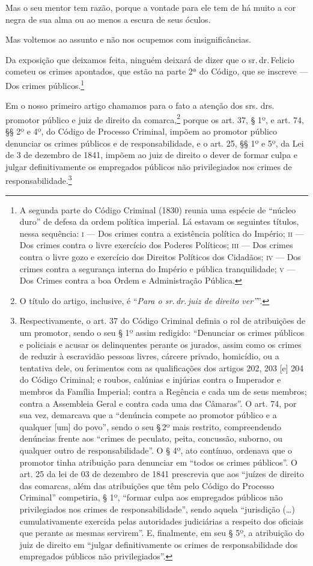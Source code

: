 Mas o seu mentor tem razão, porque a vontade para ele tem de há muito a
cor negra de sua alma ou ao menos a escura de seus óculos.

Mas voltemos ao assunto e não nos ocupemos com insignificâncias.

Da exposição que deixamos feita, ninguém deixará de dizer que o sr.\,dr.\,Felicio cometeu os crimes apontados, que estão na parte 2ª do Código,
que se inscreve --- Dos crimes públicos.\footnote{ A segunda parte do
  Código Criminal (1830) reunia uma espécie de ``núcleo duro'' de defesa
  da ordem política imperial. Lá estavam os seguintes títulos, nessa
  sequência: \textsc{i} --- Dos crimes contra a existência política do Império; \textsc{ii}
  --- Dos crimes contra o livre exercício dos Poderes Políticos; \textsc{iii} ---
  Dos crimes contra o livre gozo e exercício dos Direitos Políticos dos
  Cidadãos; \textsc{iv} --- Dos crimes contra a segurança interna do Império e
  pública tranquilidade; \textsc{v} --- Dos Crimes contra a boa Ordem e
  Administração Pública.}

Em o nosso primeiro artigo chamamos para o fato a atenção dos srs. drs.
promotor público e juiz de direito da comarca,\footnote{ O título do
  artigo, inclusive, é ``\emph{Para o sr.\,dr.\,juiz de direito ver''}''.}
porque os art. 37, § 1º, e art. 74, §§ 2º e 4º, do Código de Processo
Criminal, impõem ao promotor público denunciar os crimes públicos e de
responsabilidade, e o art. 25, §§ 1º e 5º, da Lei de 3 de dezembro de
1841, impõem ao juiz de direito o dever de formar culpa e julgar
definitivamente os empregados públicos não privilegiados nos crimes de
responsabilidade.\footnote{ Respectivamente, o art. 37 do Código
  Criminal definia o rol de atribuições de um promotor, sendo o seu § 1º
  assim redigido: ``Denunciar os crimes públicos e policiais e acusar os
  delinquentes perante os jurados, assim como os crimes de reduzir à
  escravidão pessoas livres, cárcere privado, homicídio, ou a tentativa
  dele, ou ferimentos com as qualificações dos artigos 202, 203 {[}e{]}
  204 do Código Criminal; e roubos, calúnias e injúrias contra o
  Imperador e membros da Família Imperial; contra a Regência e cada um
  de seus membros; contra a Assembleia Geral e contra cada uma das
  Câmaras''. O art. 74, por sua vez, demarcava que a ``denúncia compete ao
  promotor público e a qualquer {[}um{]} do povo'', sendo o seu §\,2º mais
  restrito, compreendendo denúncias frente aos ``crimes de peculato,
  peita, concussão, suborno, ou qualquer outro de responsabilidade''. O §
  4º, ato contínuo, ordenava que o promotor tinha atribuição para
  denunciar em ``todos os crimes públicos''. O art. 25 da lei de
  03 de dezembro de 1841 prescrevia que aos ``juízes de direito das comarcas, além
  das atribuições que têm pelo Código do Processo Criminal'' competiria,
  § 1º, ``formar culpa aos empregados públicos não privilegiados nos
  crimes de responsabilidade'', sendo aquela ``jurisdição (\ldots{})
  cumulativamente exercida pelas autoridades judiciárias a respeito dos
  oficiais que perante as mesmas servirem''. E, finalmente, em seu § 5º,
  a atribuição do juiz de direito em ``julgar definitivamente os crimes
  de responsabilidade dos empregados públicos não privilegiados''.}

